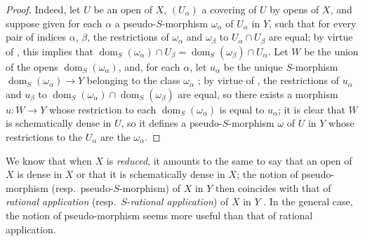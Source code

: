 \begin{proof}
Indeed, let $U$ be an open of $X$, $(U_\alpha)$ a covering of $U$ by opens of $X$, and suppose given for each $\alpha$ a pseudo-$S$-morphism $\omega_\alpha$ of $U_\alpha$ in $Y$, such that for every pair of indices $\alpha$, $\beta$, the restrictions  of $\omega_\alpha$ and $\omega_\beta$ to $U_\alpha\cap U_\beta$ are equal;
by virtue of , this implies that $\operatorname{dom}_S(\omega_\alpha)\cap U_\beta=\operatorname{dom}_S(\omega_\beta)\cap U_\alpha$.
Let $W$ be the union of the opens $\operatorname{dom}_S(\omega_\alpha)$, and, for each $\alpha$, let $u_\alpha$ be the unique $S$-morphism $\operatorname{dom}_S(\omega_\alpha)\to Y$ belonging to the class $\omega_\alpha$ ;
by virtue of , the restrictions of $u_\alpha$ and $u_\beta$ to $\operatorname{dom}_S(\omega_\alpha)\cap\operatorname{dom}_S(\omega_\beta)$ are equal, so there exists a morphism $u:W\to Y$ whose restriction to each $\operatorname{dom}_S(\omega_\alpha)$ is equal to $u_\alpha$;
it is clear that $W$ is schematically dense in $U$, so it defines a pseudo-$S$-morphism $\omega$ of $U$ in $Y$ whose restrictions to the $U_\alpha$ are the $\omega_\alpha$.
\end{proof}

\begin{remark}[20.2.7]
\label{IV.20.2.7}
We know  that when $X$ is \emph{reduced}, it amounts to the same to say that an open of $X$ is dense in $X$ or that it is schematically dense in $X$;
the notion of pseudo-morphism (resp.\ pseudo-$S$-morphism) of $X$ in $Y$ then coincides with that of \emph{rational application} (resp.\ $S$-\emph{rational application}) of $X$ in $Y$ .
In the general case, the notion of pseudo-morphism seems more useful than that of rational application.
\end{remark}

